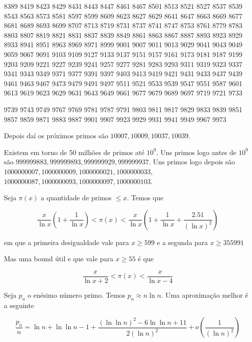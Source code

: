     \vfill
    
    8389
    8419
    8423
    8429
    8431
    8443
    8447
    8461
    8467
    8501
    8513
    8521
    8527
    8537
    8539
    8543
    8563
    8573
    8581
    8597
    8599
    8609
    8623
    8627
    8629
    8641
    8647
    8663
    8669
    8677
    8681
    8689
    8693
    8699
    8707
    8713
    8719
    8731
    8737
    8741
    8747
    8753
    8761
    8779
    8783
    8803
    8807
    8819
    8821
    8831
    8837
    8839
    8849
    8861
    8863
    8867
    8887
    8893
    8923
    8929
    8933
    8941
    8951
    8963
    8969
    8971
    8999
    9001
    9007
    9011
    9013
    9029
    9041
    9043
    9049
    9059
    9067
    9091
    9103
    9109
    9127
    9133
    9137
    9151
    9157
    9161
    9173
    9181
    9187
    9199
    9203
    9209
    9221
    9227
    9239
    9241
    9257
    9277
    9281
    9283
    9293
    9311
    9319
    9323
    9337
    9341
    9343
    9349
    9371
    9377
    9391
    9397
    9403
    9413
    9419
    9421
    9431
    9433
    9437
    9439
    9461
    9463
    9467
    9473
    9479
    9491
    9497
    9511
    9521
    9533
    9539
    9547
    9551
    9587
    9601
    9613
    9619
    9623
    9629
    9631
    9643
    9649
    9661
    9677
    9679
    9689
    9697
    9719
    9721
    9733
    
    \vfill
    
    9739
    9743
    9749
    9767
    9769
    9781
    9787
    9791
    9803
    9811
    9817
    9829
    9833
    9839
    9851
    9857
    9859
    9871
    9883
    9887
    9901
    9907
    9923
    9929
    9931
    9941
    9949
    9967
    9973
    
    \vfill
    
    

Depois daí os próximos primos são $10007, 10009, 10037, 10039$.

Existem em torno de 50 milhões de primos até $10^9$. Uns primos logo antes de $10^9$
são $999999883, 999999893, 999999929, 999999937$. Uns primos logo depois são 
$1000000007, 1000000009, 1000000021, 1000000033,$ $1000000087, 1000000093, 1000000097, 1000000103 $.

Seja $\pi(x)$ a quantidade de primos $\leq x$. Temos que

$$ \dfrac{x}{\ln x} \left( 1 + \dfrac{1}{\ln x}\right) < \pi (x) < \dfrac{x}{\ln x} \left( 1 + \dfrac{1}{\ln x} + \dfrac{2.51}{(\ln x)^2} \right)$$

em que a primeira desigualdade vale para $x \geq 599$ e a segunda para $x \geq 355991$

Mas uma bound útil e que vale para $x \geq 55$ é que 

$$ \dfrac{x}{\ln x + 2} < \pi (x) < \dfrac{x}{\ln x - 4}$$

Seja $p_n$ o enésimo número primo. Temos $p_n \approx n \ln n$. Uma aproximação melhor é a seguinte

$$\dfrac{p_n}{n} = \ln n + \ln \ln n - 1 + \dfrac{(\ln \ln n)^2 - 6 \ln \ln n + 11}{2 (\ln n)^2} + o \left( \dfrac{1}{(\ln n)^2} \right)$$
